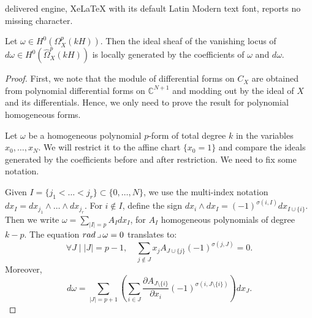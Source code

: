\documentclass[10pt,a4paper]{amsart}
\DeclareMathOperator{\cont}{\lrcorner}
\newcommand{\CC}{\mathbb{C}}
\newcommand{\rad}{ {\rm rad}}
\begin{document}
delivered engine, XeLaTeX with its default Latin Modern text font, reports no missing character.
\begin{lemma}
Let $\omega \in H^0(\Omega_X^p(kH))$. Then the ideal sheaf of the vanishing locus of $d\omega \in H^0(\widehat{\Omega}_X^p(kH))$ is locally generated by the coefficients of $\omega$ and $d\omega$. 
\end{lemma}

\begin{proof}

First, we note that the module of differential forms on $C_X$ are obtained from polynomial differential forms on $\CC^{N+1}$ and modding out by the ideal of $X$ and its differentials. Hence, we only need to prove the result for polynomial homogeneous forms.

Let $\omega$ be a homogeneous polynomial $p$-form of total degree $k$ in the variables $x_0, \dots, x_N$. We will restrict it to the affine chart $\{x_0 = 1\}$ and compare the ideals generated by the coefficients before and after restriction. We need to fix some notation.

Given $I = \{j_1 < \dots < j_r \} \subset \{0, \dots, N\}$, we use the multi-index notation $dx_I = dx_{j_1}\wedge \dots \wedge dx_{j_r}$. For $i\not\in I$, define the sign $dx_i \wedge dx_I = (-1)^{\sigma(i,I)} dx_{I\cup \{i\}}$. Then we write $\omega = \sum_{|I| = p} A_Idx_I$, for $A_I$ homogeneous polynomials of degree $k-p$. The equation $\rad \cont \omega = 0$ translates to: 
\begin{equation}\label{eq:euler-relation}
    \forall J \mid |J| = p-1, \quad \sum_{j\not\in  J} x_j A_{J\cup \{j\}}(-1)^{\sigma(j,J)} = 0.
\end{equation}
Moreover,
\begin{equation}
    d\omega = \sum_{|J| = p+1} \left(\sum_{i\in J} \frac{\partial A_{J\setminus \{i\} }}{\partial x_i} (-1)^{\sigma(i,J\setminus \{i\})} \right) dx_J. 
\end{equation}


\end{proof}
\end{document}
